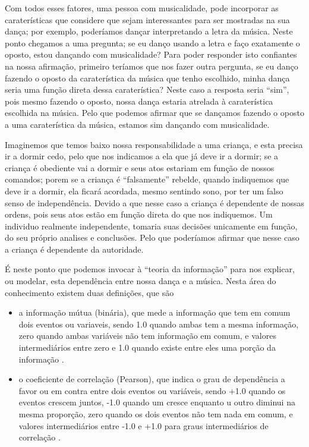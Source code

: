 Com todos esses fatores, uma pessoa com musicalidade, 
pode incorporar as caraterísticas que considere que sejam interessantes para 
ser mostradas na sua dança; por exemplo, poderíamos dançar interpretando a letra da música.
Neste ponto chegamos a uma pregunta; se eu danço usando a letra e faço exatamente o oposto,
estou dançando com musicalidade?
Para poder responder isto confiantes na nossa afirmação,
primeiro teríamos que nos fazer outra pergunta, 
se eu danço fazendo o oposto da caraterística da música que tenho escolhido,
minha dança seria uma função direta dessa caraterística?
Neste caso a resposta seria ``sim'', pois mesmo fazendo o oposto,
nossa dança estaria atrelada à caraterística escolhida na música.
Pelo que podemos afirmar que se dançamos fazendo o oposto a uma caraterística da música, 
estamos sim dançando com musicalidade.
\begin{example}
Imaginemos que temos baixo nossa responsabilidade a uma criança,
e esta precisa ir a dormir cedo, pelo que nos indicamos a ela que já deve ir a dormir;
se a criança é obediente vai a dormir e seus atos estariam em função de nossos comandos;
porem se a criança é ``falsamente'' rebelde, quando indiquemos que deve ir a dormir,
ela ficará acordada, mesmo sentindo sono, por ter um falso senso de independência.
Devido a que nesse caso a criança é dependente de nossas ordens,
pois seus atos estão em função direta do que nos indiquemos.
Um individuo realmente independente, tomaria suas decisões unicamente em função,
do seu próprio analises e conclusões.
Pelo que poderíamos afirmar que nesse caso a criança é dependente da autoridade.
\end{example}

É neste ponto que podemos invocar à ``teoria da informação'' para nos explicar,
ou modelar, esta dependência entre nossa dança e a música.
Nesta área do conhecimento existem duas definições, que são
\begin{itemize} 
\item a informação mútua (binária), que mede a informação que tem em comum dois eventos ou variaveis,
sendo 1.0 quando ambas tem a mesma informação,
zero quando ambas variáveis não tem informação em comum, 
e valores intermediários entre zero e 1.0 quando existe entre eles uma porção da informação \cite[pp. ]{reza2012introduction}. 
\item o coeficiente de correlação (Pearson), 
que indica o grau de dependência a favor ou em contra entre dois eventos ou variáveis,
sendo +1.0 quando os eventos crescem juntos, 
-1.0 quando um cresce enquanto u outro diminui na mesma proporção,
 zero quando os dois eventos não tem nada em comum, 
e valores intermediários entre -1.0 e +1.0 para graus intermediários de correlação \cite[pp. ]{reza2012introduction}.
\end{itemize} 


